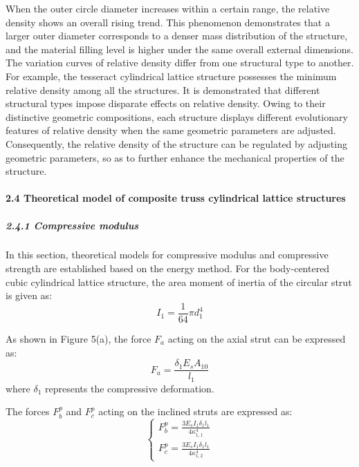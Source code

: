 \documentclass{article} %
\begin{document}
When the outer circle diameter increases within a certain range, the relative density shows an overall rising trend. This phenomenon demonstrates that a larger outer diameter corresponds to a denser mass distribution of the structure, and the material filling level is higher under the same overall external dimensions. The variation curves of relative density differ from one structural type to another. For example, the tesseract cylindrical lattice structure possesses the minimum relative density among all the structures. It is demonstrated that different structural types impose disparate effects on relative density. Owing to their distinctive geometric compositions, each structure displays different evolutionary features of relative density when the same geometric parameters are adjusted. Consequently, the relative density of the structure can be regulated by adjusting geometric parameters, so as to further enhance the mechanical properties of the structure.

\noindent 
\paragraph{2.4 Theoretical model of composite truss cylindrical lattice structures}

\noindent 
\subparagraph{2.4.1 Compressive modulus}

In this section, theoretical models for compressive modulus and compressive strength are established based on the energy method. For the body-centered cubic cylindrical lattice structure, the area moment of inertia of the circular strut is given as:
\begin{equation} \label{GrindEQ__8_} 
I_{1} =\frac{1}{64} \pi d_{1}^{4}  
\end{equation} 

As shown in Figure 5(a), the force $F_{a} $ acting on the axial strut can be expressed as:
\begin{equation} \label{GrindEQ__9_} 
F_{a} =\frac{\delta _{1} E_{s} A_{10} }{l_{1} }  
\end{equation} 
where $\delta _{1} $ represents the compressive deformation.

The forces $F_{b}^{p} $ and $F_{c}^{p} $ acting on the inclined struts are expressed as:
\begin{equation} \label{GrindEQ__10_} 
\left\{\begin{array}{l} {F_{b}^{p} =\frac{3E_{s} I_{1} \delta _{1} l_{1} }{4\kappa _{1,1}^{4} } } \\ {F_{c}^{p} =\frac{3E_{s} I_{1} \delta _{1} l_{1} }{4\kappa _{1,2}^{4} } } \end{array}\right.  
\end{equation} 
\end{document}
